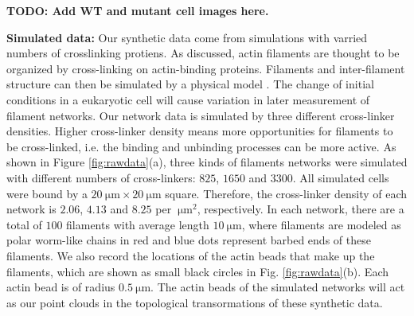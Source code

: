 \documentclass[10pt]{article}
\begin{document}
\textbf{TODO: Add WT and mutant cell images here.}

\textbf{Simulated data:}
Our synthetic data come from simulations with varried numbers of crosslinking protiens. As discussed, actin filaments are thought to be organized by cross-linking on actin-binding proteins. Filaments and inter-filament structure can then be simulated by a physical model \cite{freedman2017versatile,freedman2018nonequilibrium}. The change of initial conditions in a eukaryotic cell will cause variation in later measurement of filament networks. Our network data is simulated by three different cross-linker densities. Higher cross-linker density means more opportunities for filaments to be cross-linked, i.e. the binding and unbinding processes can be more active. As shown in Figure \ref{fig:rawdata}(a), three kinds of filaments networks were simulated with different numbers of cross-linkers:  $825$, $1650$ and $3300$. All simulated cells were bound by a $\SI{20}{\micro\metre} \times \SI{20}{\micro\metre}$ square. Therefore, the cross-linker density of each network is $2.06$, $4.13$ and $8.25$ per $\SI{}{\micro\metre}^2$, respectively. In each network, there are a total of $100$ filaments with average length $\SI{10}{\micro\metre}$, where filaments are modeled as polar worm-like chains in red and blue dots represent barbed ends of these filaments. We also record the locations of the actin beads that make up the filaments, which are shown as small black circles in Fig. \ref{fig:rawdata}(b). Each actin bead is of radius $\SI{0.5}{\micro\metre}$. The actin beads of the simulated networks will act as our point clouds in the topological transormations of these synthetic data.
\end{document}
